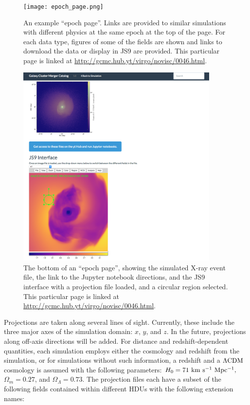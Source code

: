 \documentclass{emulateapj}
\begin{document}
\begin{figure}
\begin{center}
\texttt{[image: epoch\_page.png]}
\caption{An example ``epoch page''. Links are provided to similar simulations with different physics at the same epoch at the top of the page. For each data type, figures of some of the fields are shown and links to download the data or display in JS9 are provided. This particular page is linked at \url{http://gcmc.hub.yt/virgo/novisc/0046.html}.}
\end{center}
\end{figure}

\begin{figure}
\begin{center}
\includegraphics[width=0.9\textwidth]{epoch_page2.png}
\caption{The bottom of an ``epoch page'', showing the simulated X-ray event file, the link to the Jupyter notebook directions, and the JS9 interface with a projection file loaded, and a circular region selected. This particular page is linked at \url{http://gcmc.hub.yt/virgo/novisc/0046.html}.}
\end{center}
\end{figure}

Projections are taken along several lines of sight. Currently, these include the three major axes of the simulation domain: $x$, $y$, and $z$. In the future, projections along off-axis directions will be added. For distance and redshift-dependent quantities, each simulation employs either the cosmology and redshift from the simulation, or for simulations without such information, a redshift and a $\Lambda{\rm CDM}$ cosmology is assumed with the following parameters: $H_0 = 71~{\rm km~s^{-1}~Mpc^{-1}},$ $\Omega_m = 0.27$, and $\Omega_\Lambda = 0.73$. The projection files each have a subset of the following fields contained within different HDUs with the following extension names:
\end{document}
